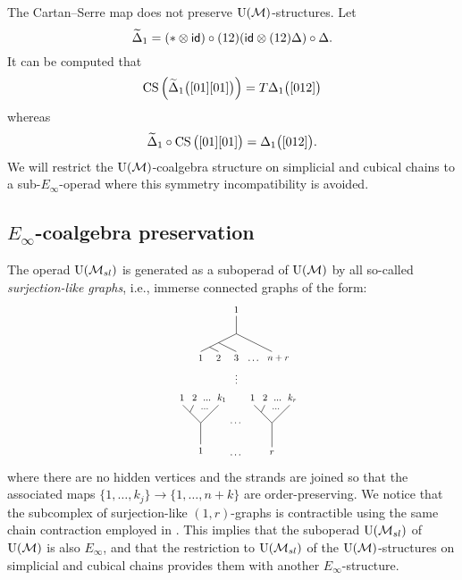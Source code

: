 \begin{example*}
	The Cartan--Serre map does not preserve ${\operatorname{U}(\mathcal{M})}$-structures.
	Let
	\[
	\widetilde\Delta_1 = (\ast \otimes \mathsf{id}) \circ (12) (\mathsf{id} \otimes (12) \Delta) \circ \Delta.
	\]
	It can be computed that
	\[
	\operatorname{CS}\Big( \widetilde\Delta_1 \big( [01][01] \big) \Big) =
	T \Delta_1 \big( [012] \big)
	\]
	whereas
	\[
	\widetilde\Delta_1 \circ \operatorname{CS} \big( [01][01] \big) =
	\Delta_1 \big( [012] \big).
	\]
	We will restrict the ${\operatorname{U}(\mathcal{M})}$-coalgebra structure on simplicial and cubical chains to a sub-$E_\infty$-operad where this symmetry incompatibility is avoided.
\end{example*}

\subsection{$E_\infty$-coalgebra preservation}

The operad ${\operatorname{U}(\mathcal{M}_{sl})}$ is generated as a suboperad of ${\operatorname{U}(\mathcal{M})}$ by all so-called \textit{surjection-like graphs}, i.e., immerse connected graphs of the form:
\begin{equation*}
	\begin{tikzpicture}[scale=1]
		\draw (0,0)--(0,-.6) node[below, scale=.75]{$1$};
		\draw (0,0)--(.5,.5);
		\draw (-.3, .3)-- (-.2,.5) node[scale=.75] at (-.2,.7) {\qquad $1\, \ \ 2\ \ ...\ \ k_1$};
		\draw (-.5,.5)--(0,0);
		\node[scale=.75] at (.11,.4){$..$.};

		\node[scale=.75] at (1,0){$\cdots$};
		\node[scale=.75] at (1,-.9){$\cdots$};

		\draw (2,0)--(2,-.68) node[scale=.75, below]{$r$};
		\draw (2,0)--(2.5,.5);
		\draw (1.7, .3)--(1.8,.5) node[scale=.75] at (1.78,.7) {\qquad $1\, \ \ 2\ \ ...\ \ k_r$};
		\draw (1.5,.5)--(2,0);
		\node[scale=.75] at (2.11,.4){$..$.};

		\draw (1,2.5)--(1,3) node[scale=.75, above]{$1$};
		\draw (1,2.5)--(0,2) node[scale=.75, below]{$1$};
		\draw (.25,2.125)--(.5,2) node[scale=.75, below]{$2$};
		\draw (.5,2.25)--(1,2) node[scale=.75, below]{$3$};
		\draw (1,2.5)--(2,2) node[scale=.75, below]{\ \quad $n + r$};
		\node[scale=.75] at (1.5,1.75){$\cdots$};

		\node[scale=.75] at (1,1.3) {$\vdots$};

		\node at (2.85,0){};
	\end{tikzpicture}
\end{equation*}
where there are no hidden vertices and the strands are joined so that the associated maps $\{1, \dots, k_j\} \to \{1, \dots, n+k\}$ are order-preserving.
We notice that the subcomplex of surjection-like $(1,r)$-graphs is contractible using the same chain contraction employed in \cite{medina2020prop1}.
This implies that the suboperad ${\operatorname{U}(\mathcal{M}_{sl})}$ of ${\operatorname{U}(\mathcal{M})}$ is also $E_\infty$, and that the restriction to ${\operatorname{U}(\mathcal{M}_{sl})}$ of the ${\operatorname{U}(\mathcal{M})}$-structures on simplicial and cubical chains provides them with another $E_\infty$-structure.

